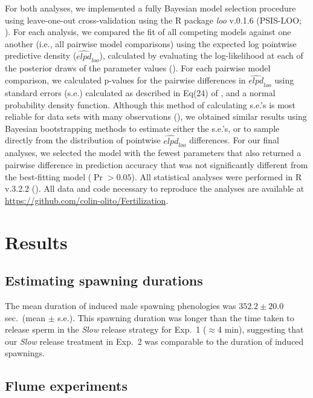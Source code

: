 \documentclass{article}
\begin{document}
	For both analyses, we implemented a fully Bayesian model selection procedure using leave-one-out cross-validation using the R package \textit{loo} v.0.1.6 (PSIS-LOO; \citealt{Vehtari2016}). For each analysis, we compared the fit of all competing models against one another (i.e., all pairwise model comparisons) using the expected log pointwise predictive density ($\widehat{\textit{elpd}}_{\textit{loo}}$), calculated by evaluating the log-likelihood at each of the posterior draws of the parameter values (\citealt{HootenHobbs2015,Vehtari2016}). For each pairwise model comparison, we calculated p-values for the pairwise differences in $\widehat{\textit{elpd}}_{\textit{loo}}$ using standard errors (s.e.) calculated as described in Eq(24) of \citet{Vehtari2016}, and a normal probability density function. Although this method of calculating s.e.'s is most reliable for data sets with many observations (\citealt{Vehtari2016}), we obtained similar results using Bayesian bootstrapping methods to estimate either the s.e.'s, or to sample directly from the distribution of pointwise $\widehat{\textit{elpd}}_{\textit{loo}}$ differences. For our final analyses, we selected the model with the fewest parameters that also returned a pairwise difference in prediction accuracy that was not significantly different from the best-fitting model ($\Pr > 0.05$). All statistical analyses were performed in R v.3.2.2 (\citealt{R2016}). All data and code necessary to reproduce the analyses are available at \url{https://github.com/colin-olito/Fertilization}.

\section*{Results}

	\subsection*{Estimating spawning durations}

	The mean duration of induced male spawning phenologies was $352.2 \pm 20.0$ sec.~(mean $\pm$ s.e.). This spawning duration was longer than the time taken to release sperm in the \textit{Slow} release strategy for Exp.~1 ($\approx$4 min), suggesting that our \textit{Slow} release treatment in Exp.~2 was comparable to the duration of induced spawnings.

	\subsection*{Flume experiments}
\end{document}
